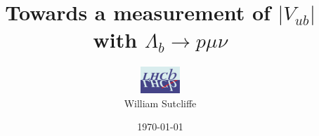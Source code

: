 \documentclass{beamer}
\begin{document}
{


\title[ Towards a measurement of $|V_{ub}|$  with $\Lambda_{b} \rightarrow p \mu \nu$ \hspace{2em}\insertframenumber/
\inserttotalframenumber]{Towards a measurement of $|V_{ub}|$  with $\Lambda_{b} \rightarrow p \mu \nu$}
\author[William Sutcliffe]{\includegraphics[height=1cm,width=1.5cm]{lhcblogo.jpg} \\ William Sutcliffe}

\date{\today}

 \frame{\titlepage

} 









}
\end{document}

